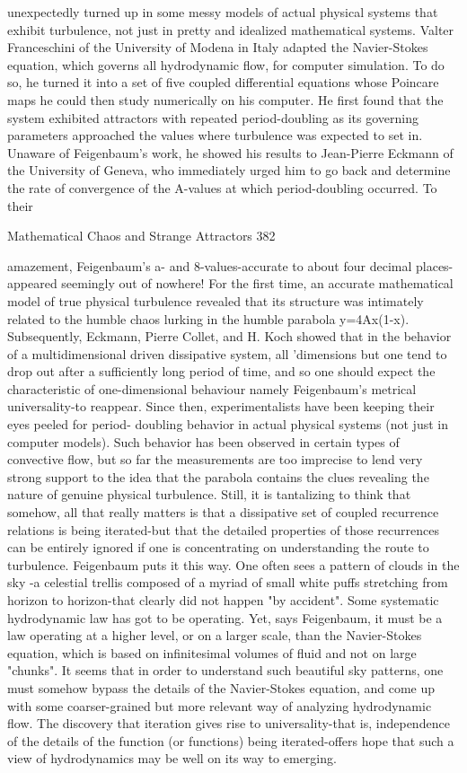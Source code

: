 unexpectedly turned up in some messy models of actual physical systems that exhibit
turbulence, not just in pretty and idealized mathematical systems. Valter Franceschini
of the University of Modena in Italy adapted the Navier-Stokes equation, which
governs all hydrodynamic flow, for computer simulation. To do so, he turned it into a
set of five coupled differential equations whose Poincare maps he could then study
numerically on his computer. He first found that the system exhibited attractors with
repeated period-doubling as its governing parameters approached the values where
turbulence was expected to set in. Unaware of Feigenbaum's work, he showed his
results to Jean-Pierre Eckmann of the University of Geneva, who immediately urged
him to go back and determine the rate of convergence of the A-values at which
period-doubling occurred. To their




Mathematical Chaos and Strange Attractors                                              382

amazement, Feigenbaum's a- and 8-values-accurate to about four decimal places-
appeared seemingly out of nowhere! For the first time, an accurate mathematical
model of true physical turbulence revealed that its structure was intimately related to
the humble chaos lurking in the humble parabola y=4Ax(1-x). Subsequently,
Eckmann, Pierre Collet, and H. Koch showed that in the behavior of a
multidimensional driven dissipative system, all 'dimensions but one tend to drop out
after a sufficiently long period of time, and so one should expect the characteristic of
one-dimensional behaviour namely Feigenbaum's metrical universality-to reappear.
         Since then, experimentalists have been keeping their eyes peeled for period-
doubling behavior in actual physical systems (not just in computer models). Such
behavior has been observed in certain types of convective flow, but so far the
measurements are too imprecise to lend very strong support to the idea that the
parabola contains the clues revealing the nature of genuine physical turbulence. Still,
it is tantalizing to think that somehow, all that really matters is that a dissipative set of
coupled recurrence relations is being iterated-but that the detailed properties of those
recurrences can be entirely ignored if one is concentrating on understanding the route
to turbulence.
         Feigenbaum puts it this way. One often sees a pattern of clouds in the sky -a
celestial trellis composed of a myriad of small white puffs stretching from horizon to
horizon-that clearly did not happen "by accident". Some systematic hydrodynamic
law has got to be operating. Yet, says Feigenbaum, it must be a law operating at a
higher level, or on a larger scale, than the Navier-Stokes equation, which is based on
infinitesimal volumes of fluid and not on large "chunks". It seems that in order to
understand such beautiful sky patterns, one must somehow bypass the details of the
Navier-Stokes equation, and come up with some coarser-grained but more relevant
way of analyzing hydrodynamic flow. The discovery that iteration gives rise to
universality-that is, independence of the details of the function (or functions) being
iterated-offers hope that such a view of hydrodynamics may be well on its way to
emerging.

